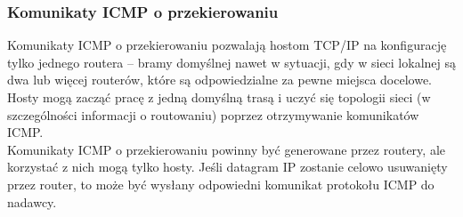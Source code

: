\documentclass[../main.tex]{subfiles}
\begin{document}
    \subsubsection{Komunikaty ICMP o przekierowaniu}
    Komunikaty ICMP o przekierowaniu pozwalają hostom TCP/IP na konfigurację tylko jednego
    routera – bramy domyślnej nawet w sytuacji, gdy w sieci lokalnej są dwa lub więcej
    routerów, które są odpowiedzialne za pewne miejsca docelowe.
    Hosty mogą zacząć pracę z jedną domyślną trasą i uczyć się topologii sieci (w szczególności
    informacji o routowaniu) poprzez otrzymywanie komunikatów ICMP.\\

    Komunikaty ICMP o przekierowaniu powinny być generowane przez routery, ale korzystać z
    nich mogą tylko hosty.
    Jeśli datagram IP zostanie celowo usuwanięty przez router, to może być wysłany odpowiedni komunikat protokołu ICMP do nadawcy.
\end{document}
